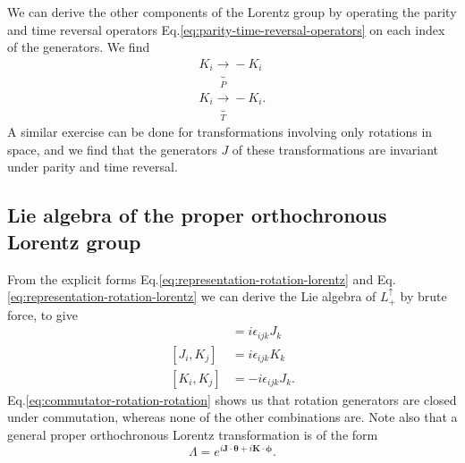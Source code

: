 \documentclass[11pt]{article}
\numberwithin{equation}{section}
\begin{document}
We can derive the other components of the Lorentz group by operating the parity and time reversal operators Eq.\eqref{eq:parity-time-reversal-operators} on each index of the generators. We find
\begin{align}
K_i \underbrace{\rightarrow}_P - K_i \\
K_i \underbrace{\rightarrow}_T - K_i.
\end{align}
A similar exercise can be done for transformations involving only rotations in space, and we find that the generators $J$ of these transformations are invariant under parity and time reversal.

\subsection{Lie algebra of the proper orthochronous Lorentz group}
From the explicit forms Eq.\eqref{eq:representation-rotation-lorentz} and Eq.\eqref{eq:representation-rotation-lorentz} we can derive the Lie algebra of $L_+^\uparrow$ by brute force, to give
\begin{align}
[J_i, J_j] &= i \epsilon_{ijk} J_k \label{eq:commutator-rotation-rotation}\\
[J_i, K_j] &= i \epsilon_{ijk} K_k \label{eq:commutator-rotation-boost}\\
[K_i, K_j] &= -i \epsilon_{ijk} J_k.\label{eq:commutator-boost-boost}
\end{align}
Eq.\eqref{eq:commutator-rotation-rotation} shows us that rotation generators are closed under commutation, whereas none of the other combinations are. Note also that a general proper orthochronous Lorentz transformation is of the form
\begin{equation}
\Lambda = e^{i \boldsymbol{J}\cdot \boldsymbol{\theta} + i \boldsymbol{K}\cdot \boldsymbol{\phi}}.
\end{equation}
\end{document}
